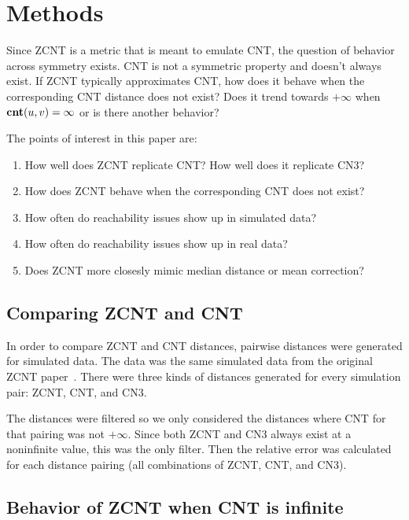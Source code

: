 \section{Methods}
Since ZCNT is a metric that is meant to emulate CNT, the question of behavior across symmetry exists. CNT is not a symmetric property and doesn't always exist. If ZCNT typically approximates CNT, how does it behave when the corresponding CNT distance does not exist? Does it trend towards $+\infty$ when $\textbf{cnt}(u, v) = \infty$ or is there another behavior?

\vspace{10pt}

\noindent The points of interest in this paper are: 

\begin{enumerate}
    \item How well does ZCNT replicate CNT\@? How well does it replicate CN3?
    \item How does ZCNT behave when the corresponding CNT does not exist?
    \item How often do reachability issues show up in simulated data? 
    \item How often do reachability issues show up in real data? 
    \item Does ZCNT more closesly mimic median distance or mean correction?
\end{enumerate}

\subsection{Comparing ZCNT and CNT}\label{section:comp_dist}

In order to compare ZCNT and CNT distances, pairwise distances were generated for simulated data. The data was the same simulated data from the original ZCNT paper~\cite{zcnt_paper}. There were three kinds of distances generated for every simulation pair: ZCNT, CNT, and CN3. 

The distances were filtered so we only considered the distances where CNT for that pairing was not $+\infty$. Since both ZCNT and CN3 always exist at a noninfinite value, this was the only filter. Then the relative error was calculated for each distance pairing (all combinations of ZCNT, CNT, and CN3). 

\subsection{Behavior of ZCNT when CNT is infinite}\label{section:behavior}

